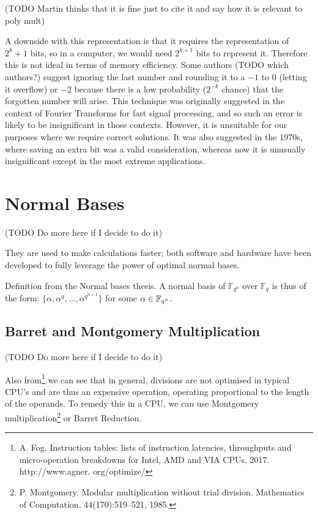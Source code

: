 \medskip

(TODO Martin thinks that it is fine just to cite it and say how it is relevant to poly mult)

\medskip

A downside with this representation is that it requires the representation of $2^k + 1$ bits, so in a computer, we would need $2^{k+1}$ bits to represent it. Therefore this is not ideal in terms of memory efficiency. Some authors (TODO which authors?) suggest ignoring the last number and rounding it to a $-1$ to $0$ (letting it overflow) or $-2$ because there is a low probability ($2^{-k}$ chance) that the forgotten number will arise. This technique was originally suggested in the context of Fourier Transforms for fast signal processing, and so such an error is likely to be insignificant in those contexts. However, it is unsuitable for our purposes where we require correct solutions. It was also suggested in the 1970s, where saving an extra bit was a valid consideration, whereas now it is unusually insignificant except in the most extreme applications.


\section{Normal Bases}

(TODO Do more here if I decide to do it)

They are used to make calculations faster; both software and hardware have been developed to fully leverage the power of optimal normal bases.

Definition from the Normal bases thesis.
A normal basis of $\mathbb{F}_{q^n}$ over $\mathbb{F}_q$ is thus of the form: $\{\alpha,\alpha^q,\ldots ,\alpha^{q^{n-1}}\}$ for some $\alpha \in {\mathbb F}_{q^n}$.

\subsection{Barret and Montgomery Multiplication}%
\label{sub:Barret and Montgomery Multiplication}

(TODO Do more here if I decide to do it)

Also from\footnote{A. Fog. Instruction tables: lists of instruction latencies, throughputs and micro-operation breakdowns for Intel, AMD and VIA CPUs, 2017. http://www.agner. org/optimize/} we can see that in general, divisions are not optimised in typical CPU's and are thus an expensive operation, operating proportional to the length of the operands. To remedy this in a CPU, we can use Montgomery multiplication\footnote{P. Montgomery. Modular multiplication without trial division. Mathematics of Computation, 44(170):519–521, 1985.} or Barret Reduction.
